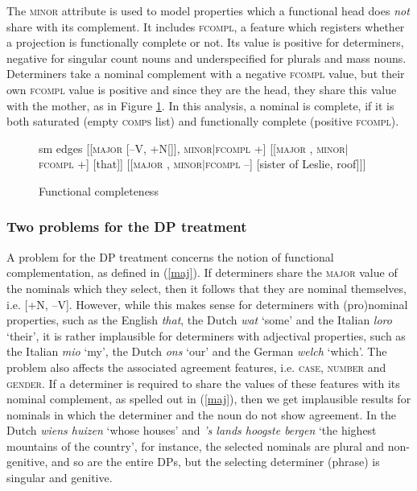 \documentclass[output=paper
                ,modfonts
                ,nonflat
	        ,collection
	        ,collectionchapter
	        ,collectiontoclongg
 	        ,biblatex
                ,babelshorthands
                ,newtxmath
                ,draftmode
                ,colorlinks, citecolor=brown
]{./langsci/langscibook}
\begin{document}
The \textsc{minor} attribute is used to model properties which a functional head does {\em not} share with its 
complement. It includes \textsc{fcompl}, a feature which registers whether a projection is 
functionally complete or not. Its value is positive for determiners, negative for  
singular count nouns and underspecified for plurals and mass nouns.  
Determiners take a nominal complement with a negative \textsc{fcompl} value, but their 
own \textsc{fcompl} value is positive and since they are the head, they share this value with 
the mother, as in Figure \ref{netter}. 
In this analysis, a nominal is complete, if it is both saturated 
(empty \textsc{comps} list) and functionally complete (positive \textsc{fcompl}). 

\begin{figure}
	\centering
	\begin{forest}
sm edges
[{[\textsc{major}  [--V, +N[]], \textsc{minor$|$fcompl} +]}
		[{[\textsc{major} , \textsc{minor$|$fcompl} +]} [that]]
		[{[\textsc{major} , \textsc{minor$|$fcompl} --]} [sister of Leslie, roof]]]
	\end{forest}
	\caption{\label{netter} Functional completeness }
\end{figure}


\subsubsection{Two problems for the DP treatment}  


A problem for the DP treatment concerns the notion of 
functional complementation, as defined in (\ref{maj}). 
If determiners share the \textsc{major} value of the nominals which they select, 
then it follows that they are nominal themselves, i.e. [+N, --V].
However, while this makes sense for determiners with (pro)nominal properties,
such as the English \emph{that}, the Dutch \emph{wat} `some' and the Italian 
\emph{loro} `their', it is rather implausible for determiners with adjectival properties,
such as the Italian \emph{mio} `my', the Dutch \emph{ons} `our' and the German
\emph{welch} `which'.   
The problem also affects the associated agreement features, i.e. \textsc{case}, 
\textsc{number} and \textsc{gender}. If a determiner 
is required to share the values of these features with its nominal complement,
as spelled out in (\ref{maj}), then we get implausible results for nominals in 
which the determiner and the noun do not show agreement.    
In the Dutch \emph{wiens huizen} `whose houses' and 
\emph{'s lands hoogste bergen} `the highest mountains of the country', for instance,  
the selected nominals are plural and non-genitive, and so are the entire DPs, but 
the selecting determiner (phrase) is singular and genitive. 
\end{document}

